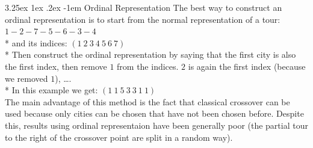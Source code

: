 \documentclass[12pt]{book}
\makeatletter
\renewcommand\paragraph{\@startsection{paragraph}{5}{\z@}%
  {3.25ex \@plus1ex \@minus.2ex}%
  {-1em}%
  {\normalfont\normalsize\bfseries}}
\makeatother
\begin{document}
\paragraph{Ordinal Representation}
The best way to construct an ordinal representation is to start from the normal representation of a tour: $1-2-7-5-6-3-4$\\*
and its indices:
$(1\ 2\ 3\ 4\ 5\ 6\ 7)$\\*
Then construct the ordinal representation by saying that the first city is also the first index, then remove $1$ from the indices. $2$ is again the first index (because we removed $1$), \dots.\\*
In this example we get: $(1\ 1\ 5\ 3\ 3\ 1\ 1)$\\
The main advantage of this method is the fact that classical crossover can be used because only cities can be chosen that have not been chosen before. Despite this, results using ordinal representaion have been generally poor (the partial tour to the right of the crossover point are split in a random way).\\
\end{document}
